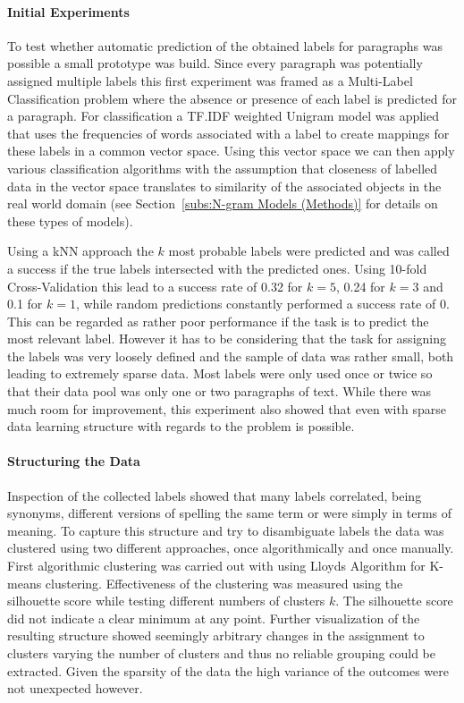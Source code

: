\paragraph{Initial Experiments}
\label{par:Initial Experiments}

To test whether automatic prediction of the obtained labels for paragraphs was possible a small prototype was build. Since every paragraph was potentially assigned multiple labels this first experiment was framed as a \gls{Multi-Label Classification} problem where the absence or presence of each label is predicted for a paragraph. For classification a TF.IDF weighted Unigram model was applied that uses the frequencies of words associated with a label to create mappings for these labels in a common vector space. Using this vector space we can then apply various classification algorithms with the assumption that closeness of labelled data in the vector space translates to similarity of the associated objects in the real world domain (see Section~\ref{subs:N-gram Models (Methods)} for details on these types of models).

Using a \gls{kNN} approach the $k$ most probable labels were predicted and was called a success if the true labels intersected with the predicted ones. Using 10-fold \gls{Cross-Validation} this lead to a success rate of 0.32 for $k=5$, 0.24 for $k=3$ and 0.1 for $k=1$, while random predictions constantly performed a success rate of 0. This can be regarded as rather poor performance if the task is to predict the most relevant label. However it has to be considering that the task for assigning the labels was very loosely defined and the sample of data was rather small, both leading to extremely sparse data. Most labels were only used once or twice so that their data pool was only one or two paragraphs of text. While there was much room for improvement, this experiment also showed that even with sparse data learning structure with regards to the problem is possible.

\paragraph{Structuring the Data}
\label{par:Structuring the Data}

Inspection of the collected labels showed that many labels correlated, being synonyms, different versions of spelling the same term or were simply in terms of meaning. To capture this structure and try to disambiguate labels the data was clustered using two different approaches, once algorithmically and once manually. First algorithmic clustering was carried out with using \gls{Lloyds Algorithm} for \gls{K-means clustering}. Effectiveness of the clustering was measured using the \gls{silhouette score} while testing different numbers of clusters $k$. The silhouette score did not indicate a clear minimum at any point. Further visualization of the resulting structure showed seemingly arbitrary changes in the assignment to clusters varying the number of clusters and thus no reliable grouping could be extracted.
Given the sparsity of the data the high variance of the outcomes were not unexpected however.

